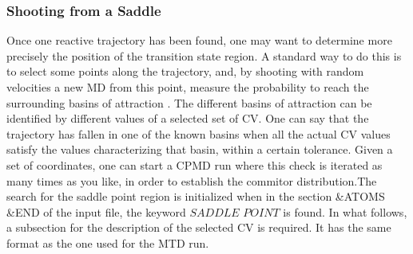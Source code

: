 \documentclass[twoside,10pt,titlepage,a4paper]{article}
\begin{document}
\subsubsection{Shooting from a Saddle}
Once one reactive trajectory has been found, one may want to
determine more precisely the position of the transition state region.
A standard way to do this is to select some points along the trajectory,
and, by shooting with random velocities a new MD from this point,
measure the probability to reach the surrounding basins of
attraction \cite{chandler}.
The different basins of attraction can be identified by different
values of a selected  set of CV. One can say that the trajectory
has fallen in one of the known basins when all the actual CV values
satisfy the values characterizing that basin, within a certain tolerance.
Given a set of coordinates, one can start a CPMD run where this check
is iterated as many times as you like, in order to establish the
commitor distribution.The search for the saddle point region is
                initialized when in the section \&ATOMS \&END of the input file,
the keyword $SADDLE$ $POINT$ is found.
In what follows, a subsection for the description of the selected CV
is required. It has the same format as the one used for the MTD run.
\end{document}
